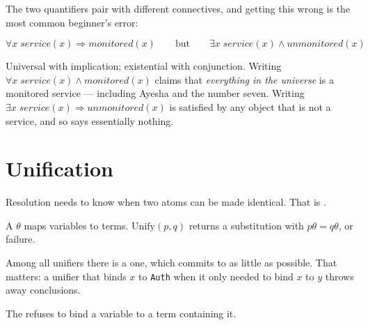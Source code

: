 The two quantifiers pair with different connectives, and getting this wrong is the
most common beginner's error:

\[
  \forall x \; \mathit{service}(x) \Rightarrow \mathit{monitored}(x)
  \qquad\text{but}\qquad
  \exists x \; \mathit{service}(x) \wedge \mathit{unmonitored}(x)
\]

Universal with implication; existential with conjunction. Writing
$\forall x\; \mathit{service}(x) \wedge \mathit{monitored}(x)$ claims that
\emph{everything in the universe} is a monitored service --- including Ayesha and
the number seven. Writing
$\exists x\; \mathit{service}(x) \Rightarrow \mathit{unmonitored}(x)$ is satisfied
by any object that is not a service, and so says essentially nothing.

\section{Unification}

Resolution needs to know when two atoms can be made identical. That is
.

\begin{definitionbox}
A  $\theta$ maps variables to terms. $\mathrm{Unify}(p, q)$
returns a substitution with $p\theta = q\theta$, or failure.

Among all unifiers there is a  one, which commits to as little as
possible. That matters: a unifier that binds $x$ to \texttt{Auth} when it only
needed to bind $x$ to $y$ throws away conclusions.

The  refuses to bind a variable to a term containing it.
\end{definitionbox}

